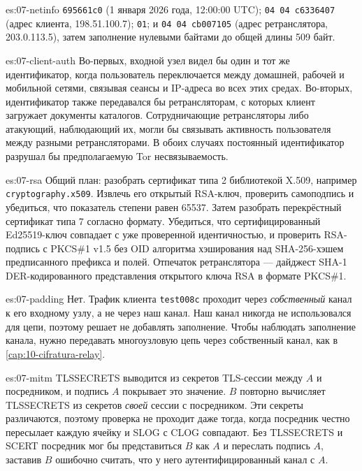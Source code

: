 \begin{soluzione}{es:07-netinfo}
\texttt{695661c0} (1 января 2026 года, 12:00:00 UTC); \texttt{04 04 c6336407} (адрес клиента, 198.51.100.7); \texttt{01}; и \texttt{04 04 cb007105} (адрес ретранслятора, 203.0.113.5), затем заполнение нулевыми байтами до общей длины 509 байт.
\end{soluzione}

\begin{soluzione}{es:07-client-auth}
Во-первых, входной узел видел бы один и тот же идентификатор, когда пользователь переключается между домашней, рабочей и мобильной сетями, связывая сеансы и IP-адреса во всех этих средах. Во-вторых, идентификатор также передавался бы ретрансляторам, с которых клиент загружает документы каталогов. Сотрудничающие ретрансляторы либо атакующий, наблюдающий их, могли бы связывать активность пользователя между разными ретрансляторами. В обоих случаях постоянный идентификатор разрушал бы предполагаемую Tor несвязываемость.
\end{soluzione}

\begin{soluzione}{es:07-rsa}
Общий план: разобрать сертификат типа 2 библиотекой X.509, например \texttt{cryptography.x509}. Извлечь его открытый RSA-ключ, проверить самоподпись и убедиться, что показатель степени равен 65537. Затем разобрать перекрёстный сертификат типа 7 согласно формату. Убедиться, что сертифицированный Ed25519-ключ совпадает с уже проверенной идентичностью, и проверить RSA-подпись с PKCS\#1 v1.5 без OID алгоритма хэширования над SHA-256-хэшем предписанного префикса и полей. Отпечаток ретранслятора — дайджест SHA-1 DER-кодированного представления открытого ключа RSA в формате PKCS\#1.
\end{soluzione}

\begin{soluzione}{es:07-padding}
Нет. Трафик клиента \texttt{test008c} проходит через \emph{собственный} канал к его входному узлу, а не через наш канал. Наш канал никогда не использовался для цепи, поэтому  решает не добавлять заполнение. Чтобы наблюдать заполнение канала, нужно передавать многоузловую цепь через собственный канал, как в \cref{cap:10-cifratura-relay}.
\end{soluzione}

\begin{soluzione}{es:07-mitm}
TLSSECRETS выводится из секретов TLS-сессии между $A$ и посредником, и подпись $A$ покрывает это значение. $B$ повторно вычисляет TLSSECRETS из секретов \emph{своей} сессии с посредником. Эти секреты различаются, поэтому проверка не проходит даже тогда, когда посредник честно пересылает каждую ячейку и SLOG с CLOG совпадают. Без TLSSECRETS и SCERT посредник мог бы представиться $B$ как $A$ и переслать подпись $A$, заставив $B$ ошибочно считать, что у него аутентифицированный канал с $A$.
\end{soluzione}

